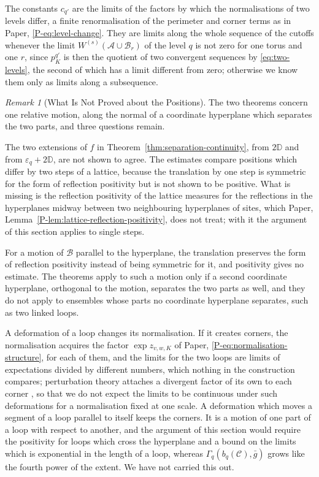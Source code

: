 \documentclass[11pt]{preprint}
\numberwithin{equation}{section}
\theoremstyle{definition}
\theoremstyle{remark}
\newtheorem{remark}[theorem]{Remark}
\theoremstyle{plain}
\begin{document}
The constants $c_{q'}$ are the limits of the factors by which the normalisations of two levels differ, a finite renormalisation of the perimeter and corner terms as in Paper, \eqref{P-eq:level-change}. They are limits along the whole sequence of the cutoffs whenever the limit $W^{(s)}(\mathcal A \cup \mathcal B_r)$ of the level $q$ is not zero for one torus and one $r$, since $p^{q'}_K$ is then the quotient of two convergent sequences by \eqref{eq:two-levels}, the second of which has a limit different from zero; otherwise we know them only as limits along a subsequence.

\begin{remark}[What Is Not Proved about the Positions]\label{rem:positions-open}
The two theorems concern one relative motion, along the normal of a coordinate hyperplane which separates the two parts, and three questions remain.

The two extensions of $f$ in Theorem~\ref{thm:separation-continuity}, from $2\mathbb D$ and from $\varepsilon_q + 2\mathbb D$, are not shown to agree. The estimates compare positions which differ by two steps of a lattice, because the translation by one step is symmetric for the form of reflection positivity but is not shown to be positive. What is missing is the reflection positivity of the lattice measures for the reflections in the hyperplanes midway between two neighbouring hyperplanes of sites, which Paper, Lemma~\ref{P-lem:lattice-reflection-positivity}, does not treat; with it the argument of this section applies to single steps.

For a motion of $\mathcal B$ parallel to the hyperplane, the translation preserves the form of reflection positivity instead of being symmetric for it, and positivity gives no estimate. The theorems apply to such a motion only if a second coordinate hyperplane, orthogonal to the motion, separates the two parts as well, and they do not apply to ensembles whose parts no coordinate hyperplane separates, such as two linked loops.

A deformation of a loop changes its normalisation. If it creates corners, the normalisation acquires the factor $\exp z_{v,w,K}$ of Paper, \eqref{P-eq:normalisation-structure}, for each of them, and the limits for the two loops are limits of expectations divided by different numbers, which nothing in the construction compares; perturbation theory attaches a divergent factor of its own to each corner \cite{Polyakov,BrandtNeriSato}, so that we do not expect the limits to be continuous under such deformations for a normalisation fixed at one scale. A deformation which moves a segment of a loop parallel to itself keeps the corners. It is a motion of one part of a loop with respect to another, and the argument of this section would require the positivity for loops which cross the hyperplane and a bound on the limits which is exponential in the length of a loop, whereas $\Gamma_q(b_q(\mathcal C), \bar g)$ grows like the fourth power of the extent. We have not carried this out.
\end{remark}



\end{document}
